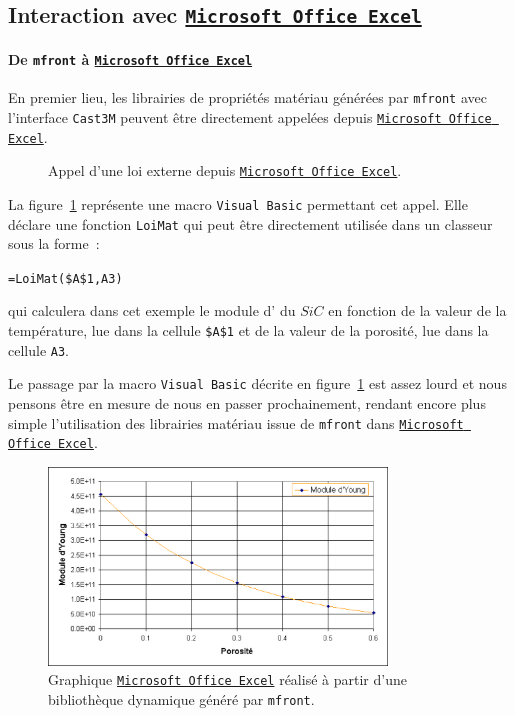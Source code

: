 \documentclass[12pt]{article}
\newcommand{\mfront}{\texttt{mfront}}
\newcommand{\castem}{\texttt{Cast3M}}
\newcommand{\sic}{$SiC$}
\newcommand{\excel}{\href{http://www.microsoft.com/france/office/2007/programs/excel/overview.mspx}{\texttt{Microsoft Office Excel}}}
\newcommand{\code}[1]{
  \psframebox[linecolor=ceaorange,shadow=true,blur=true]{
    \begin{minipage}[htbp]{1.0\linewidth}
      \ttfamily\scriptsize #1
    \end{minipage}
  }
}
\begin{document}
\subsection{Interaction avec \excel{}}
\label{sec:inter-avec-excel}


\paragraph{De \mfront{} à \excel{}}
En premier lieu, les librairies de propriétés matériau
générées par \mfront{} avec l'interface \castem{} peuvent être directement
appelées depuis \excel{}. 

\begin{figure}[htbp]
  \centering
  \code{
    
  }
  \caption{Appel d'une loi externe depuis \excel{}.}
  \label{fig:excelvba}
\end{figure}

La figure~\ref{fig:excelvba} représente une macro
\texttt{Visual Basic} permettant cet appel. Elle déclare une fonction
\texttt{LoiMat} qui peut être directement utilisée dans un classeur
sous la forme~:
\begin{center}
  \begin{minipage}[htbp]{0.9\linewidth}
    \small
    \texttt{=LoiMat(\$A\$1,A3)}
  \end{minipage}
\end{center}
qui calculera dans cet exemple le module d' du \sic{} en
fonction de la valeur de la température, lue dans la cellule
\texttt{\$A\$1} et de la valeur de la porosité, lue dans la cellule
\texttt{A3}. 

Le passage par la macro \texttt{Visual Basic} décrite en
figure~\ref{fig:excelvba} est assez lourd et nous pensons être en
mesure de nous en passer prochainement, rendant encore plus simple
l'utilisation des librairies matériau issue de \mfront{} dans
\excel{}.

\begin{figure}[htbp]
  \centering
  \includegraphics[width=9cm]{Images/mfrontexcel.eps}
  \caption{Graphique \excel{} réalisé à partir d'une
    bibliothèque dynamique généré par \mfront{}.}
  \label{fig:mfrontexcel}
\end{figure}
\end{document}

